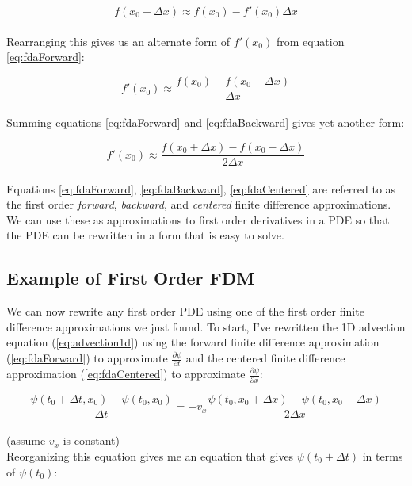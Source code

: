 {     \begin{equation}
 f(x_{0} - \Delta  x) \approx f(x_{0}) - f'(x_{0})\Delta x
  \end{equation}
    \\
  Rearranging this gives us an alternate form of $ f'(x_{0})$ from equation \ref{eq:fdaForward}:

 \begin{equation}\label{eq:fdaBackward}
 f'(x_{0}) \approx \frac{f(x_{0}) - f(x_{0} - \Delta  x)}{\Delta  x}
  \end{equation}
    \\
Summing equations \ref{eq:fdaForward} and \ref{eq:fdaBackward} gives yet another form:
  
     \begin{equation}\label{eq:fdaCentered}
 f'(x_{0}) \approx \frac{f(x_{0} + \Delta  x) - f(x_{0} - \Delta  x)}{2\Delta x}
  \end{equation}
  \\
  Equations \ref{eq:fdaForward}, \ref{eq:fdaBackward}, \ref{eq:fdaCentered} are referred to as the first order \textit{forward}, \textit{backward}, and \textit{centered} finite difference approximations.  We can use these as approximations to first order derivatives in a PDE so that the PDE can be rewritten in a form that is easy to solve.
  
\subsection{Example of First Order FDM}

We can now rewrite any first order PDE using one of the first order finite difference approximations we just found.  To start, I've rewritten the 1D advection equation (\ref{eq:advection1d}) using the forward finite difference approximation (\ref{eq:fdaForward}) to approximate $\frac{\partial \psi}{\partial t}$ and the centered finite difference approximation (\ref{eq:fdaCentered}) to approximate $\frac{\partial \psi}{\partial x}$:

 \begin{equation}
  \frac{ \psi(t_{0} + \Delta  t,  x_{0}) - \psi(t_{0}, x_{0})}{\Delta t} = -v_{x}\frac{\psi(t_{0}, x_{0} + \Delta  x)-\psi(t_{0}, x_{0}-\Delta x)}{2\Delta  x}
  \end{equation}
  \\
  (assume $v_{x}$ is constant)\\
  
  Reorganizing this equation gives me an equation that gives $\psi(t_{0}+\Delta t)$ in terms of $\psi(t_{0})$:
  
}
